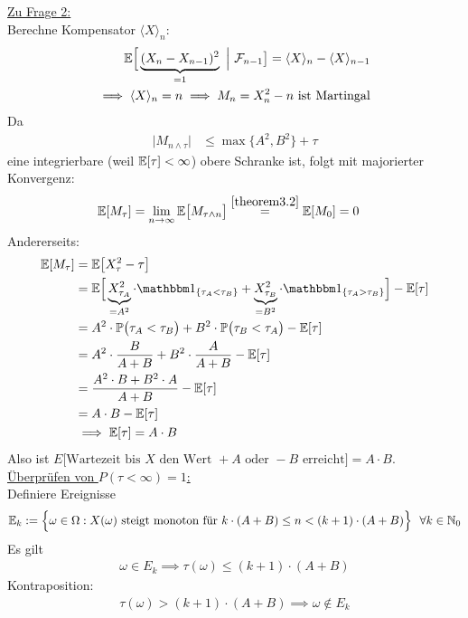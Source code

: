 \begin{beisp}
	\underline{Zu Frage 2:}\\
	Berechne Kompensator $\langle X\rangle_n$:
	\begin{align*}
		\mathbb{E}\Big[\underbrace{(X_n-X_{n-1})^2}_{=1}~\Big|~\mathcal{F}_{n-1}\big]=\langle X\rangle_n-\langle X\rangle_{n-1}\\
		\implies \langle X\rangle_n=n
		\implies M_n=X_n^2-n\text{ ist Martingal}
	\end{align*}
	Da
	\begin{align*}
		\big|M_{n\wedge\tau}\big|&\leq
		\max\lbrace A^2,B^2\rbrace+\tau
	\end{align*}
	eine integrierbare (weil $\mathbb{E}[\tau]<\infty$) obere Schranke ist, folgt mit majorierter Konvergenz:
	\begin{align*}
		\mathbb{E}[M_\tau]&=\lim\limits_{n\to\infty}\mathbb{E}\big[M_{\tau\wedge n}\big]\stackrel{\ref{theorem3.2}}{=}
		\mathbb{E}[M_0]=0
	\end{align*}
	Andererseits:
	\begin{align*}
		\E[M_\tau]
		&=\E\big[X_\tau^2-\tau\big]\\
		&=\E\Big[\underbrace{X^2_{\tau_A}}_{=A^2}\cdot\indi_{\lbrace\tau_A<\tau_B\rbrace}+\underbrace{X^2_{\tau_B}}_{=B^2}\cdot\indi_{\lbrace\tau_A>\tau_B\rbrace}\Big] - \E[\tau]\\
		&=A^2\cdot\P\big(\tau_A<\tau_B\big)+B^2\cdot\P\big(\tau_B<\tau_A\big)-\E[\tau]\\
		&=A^2\cdot\frac{B}{A+B}+B^2\cdot\frac{A}{A+B}-\E[\tau]\\
		&=\frac{A^2\cdot B + B^2 \cdot A}{A+B}-\E[\tau]\\
		&=A\cdot B-\E[\tau]\\
		&\implies
		\E[\tau]=A\cdot B
	\end{align*}
	Also ist $E\big[\text{Wartezeit bis }X\text{ den Wert }+A\text{ oder }-B\text{ erreicht}\big]=A\cdot B$.\nl
	\underline{Überprüfen von $P(\tau<\infty)=1$:}\\
	Definiere Ereignisse
	\begin{align*}
		\mathbb{E}_k:=\Big\lbrace\omega\in\Omega:X(\omega)\text{ steigt monoton für }k\cdot(A+B)\leq n<(k+1)\cdot(A+B)\Big\rbrace~~\forall k\in\mathbb{N}_0
	\end{align*}
	Es gilt
	\begin{align*}
		\omega\in E_k\implies \tau(\omega)\leq(k+1)\cdot(A+B)
	\end{align*}
	Kontraposition:
	\begin{align*}
		\tau(\omega)>(k+1)\cdot(A+B)\implies\omega\not\in E_k
	\end{align*}

\end{beisp}
